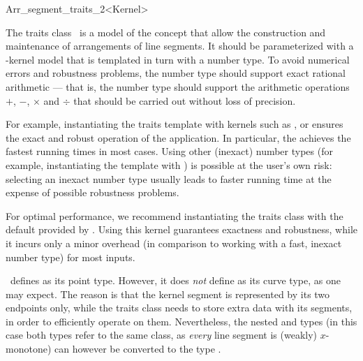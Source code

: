 
\ccRefPageBegin

\begin{ccRefClass}{Arr_segment_traits_2<Kernel>}
    
\ccDefinition 

The traits class \ccRefName\ is a model of the 
concept that allow the construction and maintenance of arrangements of
line segments. It should be parameterized with a \cgal-kernel model that is
templated in turn with a number type. To avoid numerical errors and
robustness problems, the number type should support exact rational
arithmetic --- that is, the number type should support the arithmetic
operations $+$, $-$, $\times$ and $\div$ that should be carried out
without loss of precision.

For example, instantiating the traits
template with kernels such as ,
or  ensures the exact and robust operation of
the application. In particular, the  achieves
the fastest running times in most cases. Using other (inexact) number
types (for example, instantiating the template with
) is possible at the user's own risk:
selecting an inexact number type usually leads to faster running time at
the expense of possible robustness problems.

For optimal performance, we recommend instantiating the traits class with
the default  provided by
\cgal. Using this kernel guarantees exactness and robustness, while it incurs
only a minor overhead (in comparison to working with a fast, inexact number
type) for most inputs.

\ccRefName\ defines  as its point type. However, it
does {\sl not} define  as its curve type, as one may
expect. The reason is that the kernel segment is represented by its
two endpoints only, while the traits class needs to store extra data
with its segments, in order to efficiently operate on them. Nevertheless,
the nested  and  types (in this
case both types refer to the same class, as {\sl every} line segment
is (weakly) $x$-monotone) can however be converted to the type
.


\end{ccRefClass}
